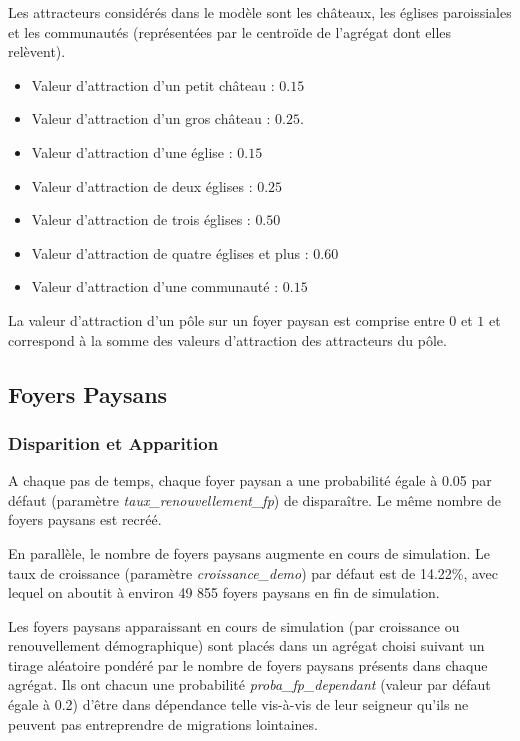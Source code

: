 \documentclass[a4paper,11pt]{article}
\begin{document}
{\bigskip
Les attracteurs considérés dans le modèle sont les châteaux, les églises paroissiales et les communautés (représentées par le centroïde de l'agrégat dont elles relèvent).
\begin{itemize}
	\item Valeur d'attraction d'un petit château : $0.15$
	\item Valeur d'attraction d'un gros château : $0.25$.
	\item Valeur d'attraction d'une église : $0.15$
	\item Valeur d'attraction de deux églises : $0.25$
	\item Valeur d'attraction de trois églises : $0.50$
	\item Valeur d'attraction de quatre églises et plus : $0.60$
	\item Valeur d'attraction d'une communauté : $0.15$
\end{itemize}

La valeur d'attraction d'un pôle sur un foyer paysan est comprise entre $0$ et $1$ et correspond à la somme des valeurs d'attraction des attracteurs du pôle.

\subsection{Foyers Paysans}

\subsubsection{Disparition et Apparition}
A chaque pas de temps, chaque foyer paysan a une probabilité égale à 0.05 par défaut (paramètre \textit{taux\_renouvellement\_fp}) de disparaître. Le même nombre de foyers paysans est recréé. 

En parallèle, le nombre de foyers paysans augmente en cours de simulation. Le taux de croissance (paramètre \textit{croissance\_demo}) par défaut est de 14.22\%, avec lequel on aboutit à environ 49 855 foyers paysans en fin de simulation.

Les foyers paysans apparaissant en cours de simulation (par croissance ou renouvellement démographique) sont placés dans un agrégat choisi suivant un tirage aléatoire pondéré par le nombre de foyers paysans présents dans chaque agrégat. Ils ont chacun une probabilité \textit{proba\_fp\_dependant} (valeur par défaut égale à 0.2) d'être dans dépendance telle vis-à-vis de leur seigneur qu'ils ne peuvent pas entreprendre de migrations lointaines.

}
\end{document}

